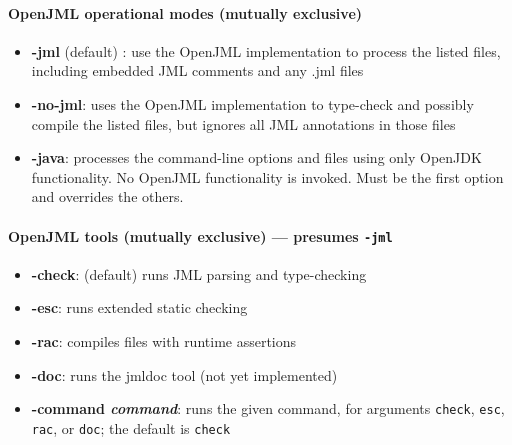 \paragraph{OpenJML operational modes (mutually exclusive)}
\begin{itemize}[noitemsep,nolistsep]
\item \textbf{-jml} (default) : use the OpenJML implementation to process the listed files, including embedded JML comments and any .jml files
\item \textbf{-no-jml}: uses the OpenJML implementation to type-check and possibly compile the listed files, but ignores all JML annotations in those files
\item \textbf{-java}: processes the command-line options and files using only OpenJDK functionality. No OpenJML functionality is invoked. Must be the first option and overrides the others.
\end{itemize}

\paragraph{OpenJML tools (mutually exclusive) --- presumes \texttt{-jml}}
\begin{itemize}[noitemsep,nolistsep]
\item \textbf{-check}: (default) runs JML parsing and type-checking
\item \textbf{-esc}: runs extended static checking
\item \textbf{-rac}: compiles files with runtime assertions
\item \textbf{-doc}: runs the jmldoc tool (not yet implemented)
\item \textbf{-command \textit{command}}: runs the given command, for arguments
\texttt{check}, \texttt{esc}, \texttt{rac}, or \texttt{doc}; 
the default is \texttt{check}
\end{itemize}

